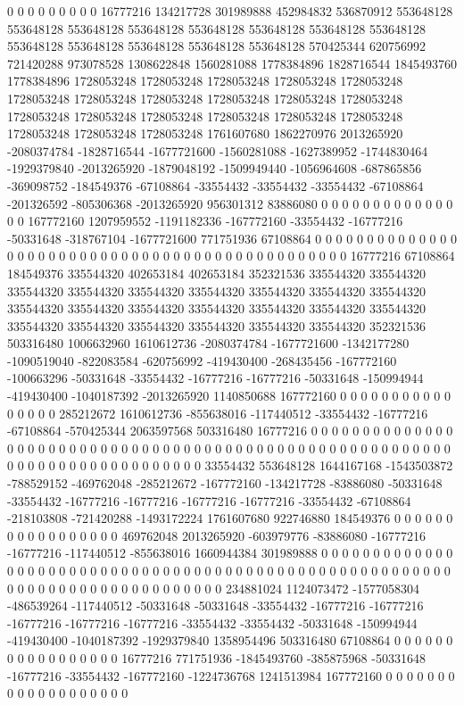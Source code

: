 0 0 0 0 0 0 0 0 0 16777216 134217728 301989888 452984832 536870912 553648128 553648128 553648128 553648128 553648128 553648128 553648128 553648128 553648128 553648128 553648128 553648128 553648128 570425344 620756992 721420288 973078528 1308622848 1560281088 1778384896 1828716544 1845493760 1778384896 1728053248 1728053248 1728053248 1728053248 1728053248 1728053248 1728053248 1728053248 1728053248 1728053248 1728053248 1728053248 1728053248 1728053248 1728053248 1728053248 1728053248 1728053248 1728053248 1728053248 1761607680 1862270976 2013265920 -2080374784 -1828716544 -1677721600 -1560281088 -1627389952 -1744830464 -1929379840 -2013265920 -1879048192 -1509949440 -1056964608 -687865856 -369098752 -184549376 -67108864 -33554432 -33554432 -33554432 -67108864 -201326592 -805306368 -2013265920 956301312 83886080 0 0 0 0 0 0 0 0 0 0 0 0 0 0 0 167772160 1207959552 -1191182336 -167772160 -33554432 -16777216 -50331648 -318767104 -1677721600 771751936 67108864 0 0 0 0 0 0 0 0 0 0 0 0 0 0 0 0 0 0
0 0 0 0 0 0 0 0 0 0 0 0 0 0 0 0 0 0 0 0 0 0 0 0 0 0 0 0 0 16777216 67108864 184549376 335544320 402653184 402653184 352321536 335544320 335544320 335544320 335544320 335544320 335544320 335544320 335544320 335544320 335544320 335544320 335544320 335544320 335544320 335544320 335544320 335544320 335544320 335544320 335544320 335544320 335544320 352321536 503316480 1006632960 1610612736 -2080374784 -1677721600 -1342177280 -1090519040 -822083584 -620756992 -419430400 -268435456 -167772160 -100663296 -50331648 -33554432 -16777216 -16777216 -50331648 -150994944 -419430400 -1040187392 -2013265920 1140850688 167772160 0 0 0 0 0 0 0 0 0 0 0 0 0 0 0 0 285212672 1610612736 -855638016 -117440512 -33554432 -16777216 -67108864 -570425344 2063597568 503316480 16777216 0 0 0 0 0 0 0 0 0 0 0 0 0 0 0 0 0 0
0 0 0 0 0 0 0 0 0 0 0 0 0 0 0 0 0 0 0 0 0 0 0 0 0 0 0 0 0 0 0 0 0 0 0 0 0 0 0 0 0 0 0 0 0 0 0 0 0 0 0 0 0 0 0 0 0 0 33554432 553648128 1644167168 -1543503872 -788529152 -469762048 -285212672 -167772160 -134217728 -83886080 -50331648 -33554432 -16777216 -16777216 -16777216 -16777216 -33554432 -67108864 -218103808 -721420288 -1493172224 1761607680 922746880 184549376 0 0 0 0 0 0 0 0 0 0 0 0 0 0 0 0 0 469762048 2013265920 -603979776 -83886080 -16777216 -16777216 -117440512 -855638016 1660944384 301989888 0 0 0 0 0 0 0 0 0 0 0 0 0 0 0 0 0 0 0
0 0 0 0 0 0 0 0 0 0 0 0 0 0 0 0 0 0 0 0 0 0 0 0 0 0 0 0 0 0 0 0 0 0 0 0 0 0 0 0 0 0 0 0 0 0 0 0 0 0 0 0 0 0 0 0 0 0 234881024 1124073472 -1577058304 -486539264 -117440512 -50331648 -50331648 -33554432 -16777216 -16777216 -16777216 -16777216 -16777216 -33554432 -33554432 -50331648 -150994944 -419430400 -1040187392 -1929379840 1358954496 503316480 67108864 0 0 0 0 0 0 0 0 0 0 0 0 0 0 0 0 0 16777216 771751936 -1845493760 -385875968 -50331648 -16777216 -33554432 -167772160 -1224736768 1241513984 167772160 0 0 0 0 0 0 0 0 0 0 0 0 0 0 0 0 0 0 0
